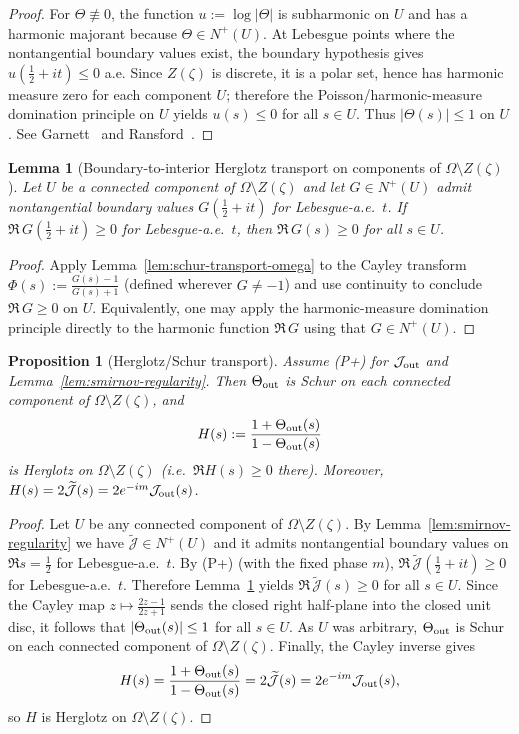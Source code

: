 \documentclass[11pt]{amsart}
\newtheorem{proposition}[theorem]{Proposition}
\newtheorem{lemma}[theorem]{Lemma}
\theoremstyle{definition}
\theoremstyle{remark}
\begin{document}
\begin{proof}
For $\Theta\not\equiv 0$, the function $u:=\log|\Theta|$ is subharmonic on $U$ and has a harmonic majorant because $\Theta\in N^+(U)$.
At Lebesgue points where the nontangential boundary values exist, the boundary hypothesis gives $u(\tfrac12+it)\le 0$ a.e.
Since $Z(\zeta)$ is discrete, it is a polar set, hence has harmonic measure zero for each component $U$;
therefore the Poisson/harmonic-measure domination principle on $U$ yields $u(s)\le 0$ for all $s\in U$.
Thus $|\Theta(s)|\le 1$ on $U$.
See Garnett~\cite[Ch.~II]{GarnettBAF} and Ransford~\cite[Ch.~5]{RansfordPT}.
\end{proof}
\begin{lemma}[Boundary-to-interior Herglotz transport on components of $\Omega\setminus Z(\zeta)$]\label{lem:herglotz-transport-omega}
Let $U$ be a connected component of $\Omega\setminus Z(\zeta)$ and let $G\in N^+(U)$ admit nontangential boundary values
$G(\tfrac12+it)$ for Lebesgue-a.e.\ $t$.
If $\Re\,G(\tfrac12+it)\ge 0$ for Lebesgue-a.e.\ $t$, then $\Re\,G(s)\ge 0$ for all $s\in U$.
\end{lemma}
\begin{proof}
Apply Lemma~\ref{lem:schur-transport-omega} to the Cayley transform
$\Phi(s):=\frac{G(s)-1}{G(s)+1}$ (defined wherever $G\neq -1$) and use continuity to conclude $\Re\,G\ge 0$ on $U$.
Equivalently, one may apply the harmonic-measure domination principle directly to the harmonic function $\Re\,G$ using that $G\in N^+(U)$.
\end{proof}
\begin{proposition}[Herglotz/Schur transport]\label{prop:herglotz-schur-transport}
Assume \textup{(P+)} for $\mathcal J_{\rm out}$ and Lemma~\ref{lem:smirnov-regularity}.
Then $\Theta_{\rm out}$ is Schur on each connected component of $\Omega\setminus Z(\zeta)$, and
\[
  H(s):=\frac{1+\Theta_{\rm out}(s)}{1-\Theta_{\rm out}(s)}
\]
is Herglotz on $\Omega\setminus Z(\zeta)$ (i.e.\ $\Re H(s)\ge 0$ there). Moreover, $H(s)=2\widetilde{\mathcal J}(s)=2e^{-im}\mathcal J_{\rm out}(s)$.
\end{proposition}
\begin{proof}
Let $U$ be any connected component of $\Omega\setminus Z(\zeta)$.
By Lemma~\ref{lem:smirnov-regularity} we have $\widetilde{\mathcal J}\in N^+(U)$ and it admits nontangential boundary values on $\Re s=\tfrac12$ for Lebesgue-a.e.\ $t$.
By \textup{(P+)} (with the fixed phase $m$), $\Re\,\widetilde{\mathcal J}(\tfrac12+it)\ge 0$ for Lebesgue-a.e.\ $t$.
Therefore Lemma~\ref{lem:herglotz-transport-omega} yields $\Re\,\widetilde{\mathcal J}(s)\ge 0$ for all $s\in U$.
Since the Cayley map $z\mapsto \frac{2z-1}{2z+1}$ sends the closed right half-plane into the closed unit disc, it follows that
$|\Theta_{\rm out}(s)|\le 1$ for all $s\in U$. As $U$ was arbitrary, $\Theta_{\rm out}$ is Schur on each connected component of $\Omega\setminus Z(\zeta)$.
Finally, the Cayley inverse gives
\[
  H(s)=\frac{1+\Theta_{\rm out}(s)}{1-\Theta_{\rm out}(s)}=2\widetilde{\mathcal J}(s)=2e^{-im}\mathcal J_{\rm out}(s),
\]
so $H$ is Herglotz on $\Omega\setminus Z(\zeta)$.
\end{proof}
\end{document}

